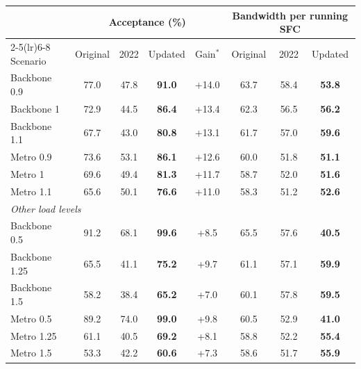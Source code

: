 \begin{tabular}{lccccccc}
\toprule
 & \multicolumn{4}{c}{Acceptance (\%)} & \multicolumn{3}{c}{Bandwidth per running SFC} \\
\cmidrule(lr){2-5}\cmidrule(lr){6-8}
Scenario & Original & 2022 & Updated & Gain$^\ast$ & Original & 2022 & Updated \\
\midrule
Backbone 0.9 & 77.0 & 47.8 & \textbf{91.0} & +14.0 & 63.7 & 58.4 & \textbf{53.8} \\
Backbone 1 & 72.9 & 44.5 & \textbf{86.4} & +13.4 & 62.3 & 56.5 & \textbf{56.2} \\
Backbone 1.1 & 67.7 & 43.0 & \textbf{80.8} & +13.1 & 61.7 & 57.0 & \textbf{59.6} \\
Metro 0.9 & 73.6 & 53.1 & \textbf{86.1} & +12.6 & 60.0 & 51.8 & \textbf{51.1} \\
Metro 1 & 69.6 & 49.4 & \textbf{81.3} & +11.7 & 58.7 & 52.0 & \textbf{51.6} \\
Metro 1.1 & 65.6 & 50.1 & \textbf{76.6} & +11.0 & 58.3 & 51.2 & \textbf{52.6} \\
\midrule \multicolumn{8}{l}{\emph{Other load levels}} \\
Backbone 0.5 & 91.2 & 68.1 & \textbf{99.6} & +8.5 & 65.5 & 57.6 & \textbf{40.5} \\
Backbone 1.25 & 65.5 & 41.1 & \textbf{75.2} & +9.7 & 61.1 & 57.1 & \textbf{59.9} \\
Backbone 1.5 & 58.2 & 38.4 & \textbf{65.2} & +7.0 & 60.1 & 57.8 & \textbf{59.5} \\
Metro 0.5 & 89.2 & 74.0 & \textbf{99.0} & +9.8 & 60.5 & 52.9 & \textbf{41.0} \\
Metro 1.25 & 61.1 & 40.5 & \textbf{69.2} & +8.1 & 58.8 & 52.2 & \textbf{55.4} \\
Metro 1.5 & 53.3 & 42.2 & \textbf{60.6} & +7.3 & 58.6 & 51.7 & \textbf{55.9} \\
\bottomrule
\end{tabular}